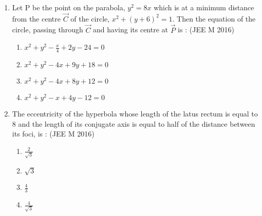 \documentclass[journal,12pt,twocolumn]{IEEEtran}
\theoremstyle{remark}
\begin{document}
\begin{enumerate}
    \item Let P be the point on the parabola, $y^2=8x$ which is at a minimum distance from the centre $\vec{C}$ of the circle, $x^2+(y+6)^2=1$. Then the equation of the circle, passing through $\vec{C}$ and having its centre at $\vec{P}$ is :
    \hfill(JEE M 2016)
    \begin{enumerate}[label=(\alph*)]
    \item $x^2+y^2-\frac{x}{4}+2y-24=0$
    \item $x^2+y^2-4x+9y+18=0$
    \item $x^2+y^2-4x+8y+12=0$
    \item $x^2+y^2-x+4y-12=0$\\
    \end{enumerate}
    
    \item The eccentricity of the hyperbola whose length of the latus rectum is equal to $8$ and the length of its conjugate axis is equal to half of the distance between its foci, is :
    \hfill(JEE M 2016)
    \begin{enumerate}[label=(\alph*)]
    \item$\frac{2}{\sqrt{3}}$
    \item$\sqrt{3}$
    \item$\frac{4}{3}$
    \item$\frac{4}{\sqrt{3}}$ \\
    \end{enumerate}

\end{enumerate}
\end{document}
